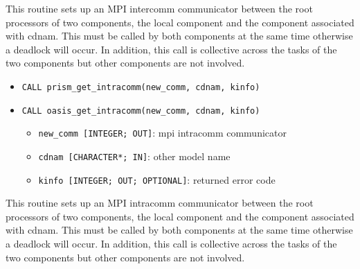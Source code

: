 This routine sets up an MPI intercomm communicator between the root
processors of two components, the local component and the component
associated with cdnam.  This must be called by both components at
the same time otherwise a deadlock will occur.  In addition, this call
is collective across the tasks of the two components but other
components are not involved.

\begin{itemize} 
\item {\tt CALL prism\_get\_intracomm(new\_comm, cdnam, kinfo)}
\item {\tt CALL oasis\_get\_intracomm(new\_comm, cdnam, kinfo)}
\begin{itemize}
\item {\tt new\_comm [INTEGER; OUT]}: mpi intracomm communicator
\item {\tt cdnam [CHARACTER*; IN]}: other model name 
\item {\tt kinfo [INTEGER; OUT; OPTIONAL]}: returned error code
\end{itemize}
\end{itemize}

This routine sets up an MPI intracomm communicator between the root
processors of two components, the local component and the component
associated with cdnam.  This must be called by both components at
the same time otherwise a deadlock will occur.  In addition, this call
is collective across the tasks of the two components but other
components are not involved.


